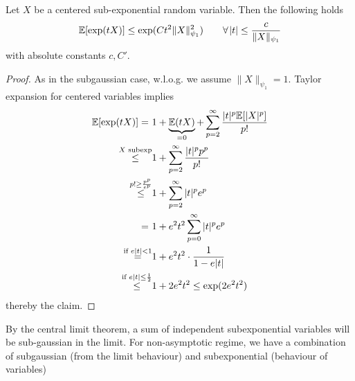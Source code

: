 \begin{lemma} \label{lem:moment-gen-subexp}
\begin{mdframed}
Let $X$ be a centered sub-exponential random variable. Then the following holds
\begin{equation*}
\E[\exp(tX)] \leq \exp(Ct^2 \|X\|^2_{\psi_1})\quad\quad \forall |t| \leq \frac{c}{\|X\|_{\psi_1}}
\end{equation*}
with absolute constants $c,C'$.
\end{mdframed}
\begin{proof}
As in the subgaussian case, w.l.o.g. we assume $\|X\|_{\psi_1} = 1$. Taylor expansion for centered variables implies
\begin{equation*}
\begin{split}
\mathbb{E}[\exp(tX)] = \ & 1 + \underbrace{\mathbb{E}(tX)}_{=0} + \sum_{p=2}^\infty \frac{|t|^p \mathbb{E}[|X|^p]}{p!} \\
\overset{X \text{ subexp}}\leq  & 1+ \sum_{p=2}^\infty \frac{|t|^p p^p}{p!} \\
\overset{p! \geq \frac{p^p}{e^p}}{\leq} & 1 + \sum_{p=2}^\infty |t|^pe^p \\
= \ & 1+e^2t^2\sum_{p=0}^\infty |t|^p e^p \\
\overset{\text{if } e|t|<1}{=}  & 1+ e^2t^2 \cdot \frac{1}{1- e|t|}	\\
\overset{\text{if } e|t|\leq \frac{1}{2}}{\leq} & 1+2e^2t^2 \leq \exp(2e^2t^2)
\end{split}
\end{equation*} 
thereby the claim.
\end{proof}
\end{lemma}
By the central limit theorem, a sum of independent subexponential variables will be sub-gaussian in the limit. For non-asymptotic regime, we have a combination of subgaussian (from the limit behaviour) and subexponential (behaviour of variables)
